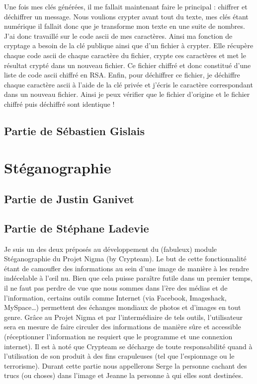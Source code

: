 \documentclass[a4paper,12pt]{article}
\begin{document}
		 Une fois mes clés générées, il me fallait maintenant faire le principal : chiffrer et déchiffrer un message. Nous voulions 
		 crypter avant tout du texte, mes clés étant numérique il fallait donc que je transforme mon texte en une suite de nombres.
		 J'ai donc travaillé sur le code ascii de mes caractères. Ainsi ma fonction de cryptage a besoin de la clé publique ainsi que
		 d'un fichier à crypter. Elle récupère chaque code ascii de chaque caractère du fichier, crypte ces caractères et met le
		 résultat crypté dans un nouveau fichier. Ce fichier chiffré et donc constitué d'une liste de code ascii chiffré en RSA.
		 Enfin, pour déchiffrer ce fichier, je déchiffre chaque caractère ascii à l'aide de la clé privée et j'écris le caractère
		 correspondant dans un nouveau fichier. Ainsi je peux vérifier que le fichier d'origine et le fichier chiffré puis déchiffré
		 sont identique !   
		\newpage 
		\subsection{Partie de Sébastien Gislais}
		\newpage
	\section{Stéganographie}
		\subsection{Partie de Justin Ganivet}
		\newpage
		\subsection{Partie de Stéphane Ladevie}
		
	Je suis un des deux préposés au développement du (fabuleux) module Stéganographie  du Projet Nigma (by Crypteam). Le but de cette fonctionnalité étant de camoufler des informations au sein d’une image de manière à les rendre indécelable à l’œil nu.
Bien que cela puisse paraître futile dans un premier temps, il ne faut pas perdre de vue que nous sommes dans l’ère des médias et de l’information, certains outils comme Internet (via Facebook, Imageshack, MySpace…) permettent des échanges mondiaux de photos et d’images en tout genre.  Grâce au Projet Nigma et par l’intermédiaire de tels outils, l’utilisateur sera en mesure de faire circuler des informations de manière sûre et accessible (réceptionner l’information  ne requiert que le programme et une connexion internet). Il est à noté que Crypteam se décharge de toute responsabilité quand à l’utilisation de son produit à des fins crapuleuses (tel que l’espionnage ou le terrorisme).
Durant cette partie nous appellerons Serge la personne cachant des trucs (ou choses) dans l’image et Jeanne la personne à qui elles sont destinées.
\end{document}
